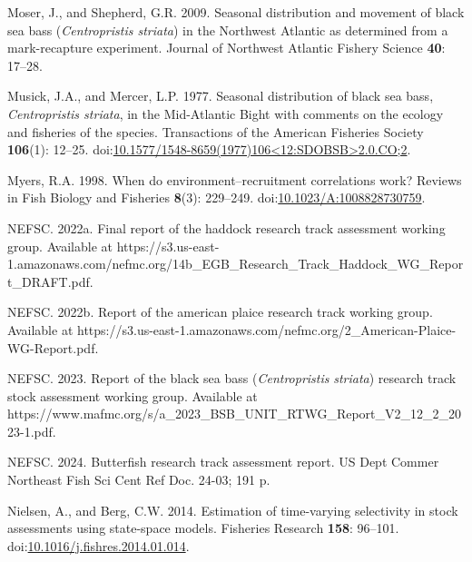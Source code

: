 \documentclass[
]{article}
\newlength{\cslhangindent}
\newlength{\cslentryspacingunit} %
\newenvironment{CSLReferences}[2] %
 {%
  \setlength{\parindent}{0pt}
  \ifodd #1
  \let\oldpar\par
  \def\par{\hangindent=\cslhangindent\oldpar}
  \fi
  \setlength{\parskip}{#2\cslentryspacingunit}
 }%
 {}
\begin{document}
\begin{CSLReferences}{1}{0}
\leavevmode{}%
Moser, J., and Shepherd, G.R. 2009. Seasonal distribution and movement
of black sea bass (\emph{{C}entropristis striata}) in the {N}orthwest
{A}tlantic as determined from a mark-recapture experiment. Journal of
Northwest Atlantic Fishery Science \textbf{40}: 17--28.

\leavevmode{}%
Musick, J.A., and Mercer, L.P. 1977. Seasonal distribution of black sea
bass, \emph{{C}entropristis striata}, in the {M}id-{A}tlantic {B}ight
with comments on the ecology and fisheries of the species. Transactions
of the American Fisheries Society \textbf{106}(1): 12--25.
doi:\href{https://doi.org/10.1577/1548-8659(1977)106\%3C12:SDOBSB\%3E2.0.CO;2}{10.1577/1548-8659(1977)106\textless12:SDOBSB\textgreater2.0.CO;2}.

\leavevmode{}%
Myers, R.A. 1998. When do environment--recruitment correlations work?
Reviews in Fish Biology and Fisheries \textbf{8}(3): 229--249.
doi:\href{https://doi.org/10.1023/A:1008828730759}{10.1023/A:1008828730759}.

\leavevmode{}%
NEFSC. 2022a. Final report of the haddock research track assessment
working group. {Available} at
https://s3.us-east-1.amazonaws.com/nefmc.org/14b\_EGB\_Research\_Track\_Haddock\_WG\_Report\_DRAFT.pdf.

\leavevmode{}%
NEFSC. 2022b. Report of the american plaice research track working
group. {Available} at
https://s3.us-east-1.amazonaws.com/nefmc.org/2\_American-Plaice-WG-Report.pdf.

\leavevmode{}%
NEFSC. 2023. Report of the black sea bass (\emph{{C}entropristis}
\emph{striata}) research track stock assessment working group.
{Available} at
https://www.mafmc.org/s/a\_2023\_BSB\_UNIT\_RTWG\_Report\_V2\_12\_2\_2023-1.pdf.

\leavevmode{}%
NEFSC. 2024. Butterfish research track assessment report. US Dept Commer
Northeast Fish Sci Cent Ref Doc. 24-03; 191 p.

\leavevmode{}%
Nielsen, A., and Berg, C.W. 2014. Estimation of time-varying selectivity
in stock assessments using state-space models. Fisheries Research
\textbf{158}: 96--101.
doi:\href{https://doi.org/10.1016/j.fishres.2014.01.014}{10.1016/j.fishres.2014.01.014}.


\end{CSLReferences}
\end{document}
